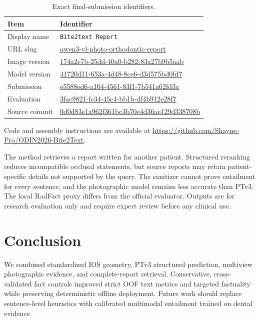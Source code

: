 \documentclass[runningheads]{llncs}
\begin{document}
\begin{table}[h]
\centering
\caption{Exact final-submission identifiers.}
\label{tab:identifiers}
\footnotesize
\begin{tabular}{@{}ll@{}}
\toprule
Item & Identifier \\
\midrule
Display name & \texttt{Bite2text Report} \\
URL slug & \url{qwen3-vl-photo-orthodontic-report} \\
Image version & \url{174a2e7b-25dd-40a0-b282-83a27b9b5aab} \\
Model version & \url{41720d11-653a-4d48-8ce6-d3d575bd0fd7} \\
Submission & \url{e5588ed6-a164-4561-83f1-7b541a62fd3a} \\
Evaluation & \url{3fac9821-fc34-45c4-bb1b-df4b912e28f7} \\
Source commit & \url{0d0d83e1a962f361bc3b70e4d36ae129d338708b} \\
\bottomrule
\end{tabular}
\end{table}

Code and assembly instructions are available at \url{https://github.com/Shayne-Pro/ODIN2026-Bite2Text}.

The method retrieves a report written for another patient. Structured reranking reduces incompatible occlusal statements, but source reports may retain patient-specific details not supported by the query. The sanitizer cannot prove entailment for every sentence, and the photographic model remains less accurate than PTv3. The local RadFact proxy differs from the official evaluator. Outputs are for research evaluation only and require expert review before any clinical use.

\section{Conclusion}

We combined standardized IOS geometry, PTv3 structured prediction, multiview photographic evidence, and complete-report retrieval. Conservative, cross-validated fact controls improved strict OOF text metrics and targeted factuality while preserving deterministic offline deployment. Future work should replace sentence-level heuristics with calibrated multimodal entailment trained on dental evidence.
\end{document}

